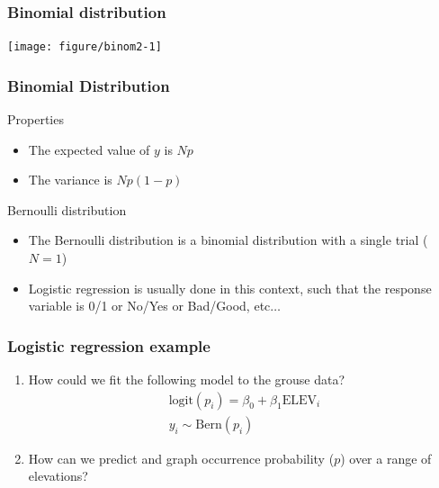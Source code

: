 \documentclass[color=usenames,dvipsnames]{beamer}\usepackage[]{graphicx}\usepackage[]{color}
\newenvironment{knitrout}{}{} %
\begin{document}
\begin{frame}[fragile]
  \frametitle{Binomial distribution}%
  \vspace{-0.4cm}
\begin{center}
\begin{knitrout}
\color{fgcolor}
\texttt{[image: figure/binom2-1]} 
\end{knitrout}
\end{center}
\end{frame}




\begin{frame}
  \frametitle{Binomial Distribution}
  {Properties}
  \begin{itemize}
    \item The expected value of $y$ is $Np$
    \item The variance is $Np(1-p)$
  \end{itemize}
  \pause
  \vfill
  {Bernoulli distribution}
  \begin{itemize}
    \item The Bernoulli distribution is a binomial distribution with a
      single trial ($N=1$)
    \item Logistic regression is usually done in this context, such
      that the response variable is 0/1 or No/Yes or Bad/Good, etc$\dots$
  \end{itemize}
\end{frame}







\begin{frame}
  \frametitle{Logistic regression example}
  \begin{enumerate}
  \item How could we fit the following model to the grouse data?
    \begin{gather*}
      \mathrm{logit}(p_i) = \beta_0 + \beta_1\mathrm{ELEV}_i \\
      y_i \sim \mathrm{Bern}(p_i)
    \end{gather*}
  \item How can we predict and graph occurrence probability ($p$) over a range of
    elevations?
  \end{enumerate}
\end{frame}
\end{document}
